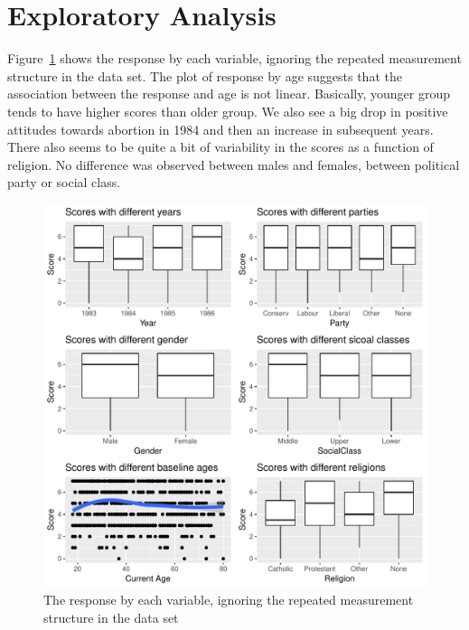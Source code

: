 \documentclass[11pt,letter]{article}\usepackage[]{graphicx}\usepackage[]{color}
\makeatletter
\def\maxwidth{ %
  \ifdim\Gin@nat@width>\linewidth
    \linewidth
  \else
    \Gin@nat@width
  \fi
}
\newenvironment{knitrout}{}{} %
\makeatother
\begin{document}
\section{Exploratory Analysis}






Figure~\ref{fig:figure-1} shows the response by each variable, ignoring the repeated measurement structure in the data set.  The plot of response by age suggests that the association between the response and age is not linear.  Basically, younger group tends to have higher scores than older group.  We also see a big drop in positive attitudes towards abortion in 1984 and then an increase in subsequent years.  There also seems to be quite a bit of variability in the scores as a function of religion.  No difference was observed between males and females, between political party or social class.

\begin{knitrout}
\color{fgcolor}\begin{figure}[H]

{\centering \includegraphics[width=\maxwidth]{figure/figure-1-1} 

}

\caption[The response by each variable, ignoring the repeated measurement structure in the data set]{The response by each variable, ignoring the repeated measurement structure in the data set}\label{fig:figure-1}
\end{figure}


\end{knitrout}
\end{document}
